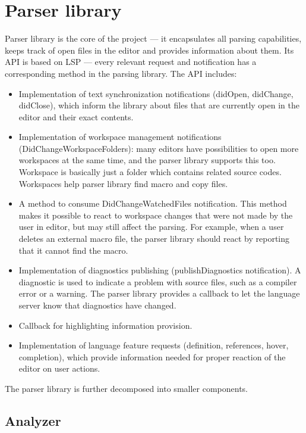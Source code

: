 \section{Parser library}

Parser library is the core of the project --- it encapsulates all parsing capabilities, keeps track of open files in the editor and provides information about them. Its API is based on LSP --- every relevant request and notification has a corresponding method in the parsing library. The API includes:

\begin{itemize}
	\item Implementation of text synchronization notifications (didOpen, didChange, didClose), which inform the library about files that are currently open in the editor and their exact contents.
	\item Implementation of workspace management notifications (DidChangeWorkspaceFolders): many editors have  possibilities to open more workspaces at the same time, and the parser library supports this too. Workspace is basically just a folder which contains related source codes. Workspaces help parser library find macro and copy files.
	\item A method to consume DidChangeWatchedFiles notification. This method makes it possible to react to workspace changes that were not made by the user in editor, but may still affect the parsing. For example, when a user deletes an external macro file, the parser library should react by reporting that it cannot find the macro.
	\item Implementation of diagnostics publishing (publishDiagnostics notification). A diagnostic is used to indicate a problem with source files, such as a compiler error or a warning. The parser library provides a callback to let the language server know that diagnostics have changed.
	\item Callback for highlighting information provision.
	\item Implementation of language feature requests (definition, references, hover, completion), which provide information needed for proper reaction of the editor on user actions.
	
\end{itemize}

The parser library is further decomposed into smaller components.

\subsection{Analyzer}


